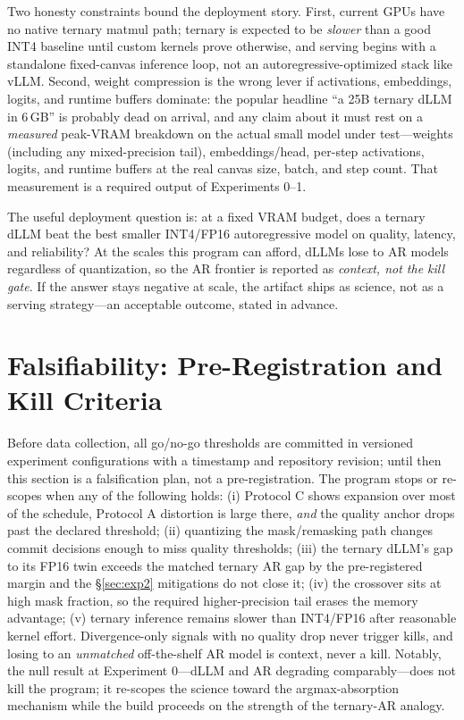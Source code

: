\documentclass[11pt]{article}
\begin{document}
Two honesty constraints bound the deployment story. First, current GPUs have no native ternary matmul path; ternary is expected to be \emph{slower} than a good INT4 baseline until custom kernels prove otherwise, and serving begins with a standalone fixed-canvas inference loop, not an autoregressive-optimized stack like vLLM. Second, weight compression is the wrong lever if activations, embeddings, logits, and runtime buffers dominate: the popular headline ``a 25B ternary dLLM in 6\,GB'' is probably dead on arrival, and any claim about it must rest on a \emph{measured} peak-VRAM breakdown on the actual small model under test---weights (including any mixed-precision tail), embeddings/head, per-step activations, logits, and runtime buffers at the real canvas size, batch, and step count. That measurement is a required output of Experiments 0--1.

The useful deployment question is: at a fixed VRAM budget, does a ternary dLLM beat the best smaller INT4/FP16 autoregressive model on quality, latency, and reliability? At the scales this program can afford, dLLMs lose to AR models regardless of quantization, so the AR frontier is reported as \emph{context, not the kill gate}. If the answer stays negative at scale, the artifact ships as science, not as a serving strategy---an acceptable outcome, stated in advance.

\section{Falsifiability: Pre-Registration and Kill Criteria}
\label{sec:falsifiability}

Before data collection, all go/no-go thresholds are committed in versioned experiment configurations with a timestamp and repository revision; until then this section is a falsification plan, not a pre-registration. The program stops or re-scopes when any of the following holds: (i) Protocol C shows expansion over most of the schedule, Protocol A distortion is large there, \emph{and} the quality anchor drops past the declared threshold; (ii) quantizing the mask/remasking path changes commit decisions enough to miss quality thresholds; (iii) the ternary dLLM's gap to its FP16 twin exceeds the matched ternary AR gap by the pre-registered margin and the \S\ref{sec:exp2} mitigations do not close it; (iv) the crossover sits at high mask fraction, so the required higher-precision tail erases the memory advantage; (v) ternary inference remains slower than INT4/FP16 after reasonable kernel effort. Divergence-only signals with no quality drop never trigger kills, and losing to an \emph{unmatched} off-the-shelf AR model is context, never a kill. Notably, the null result at Experiment 0---dLLM and AR degrading comparably---does not kill the program; it re-scopes the science toward the argmax-absorption mechanism while the build proceeds on the strength of the ternary-AR analogy.
\end{document}
